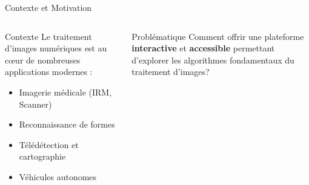\documentclass[aspectratio=169, 11pt]{beamer}
\begin{document}
\begin{frame}{Contexte et Motivation}
  \begin{columns}[T]
    \begin{block}{Contexte}
      Le traitement d'images numériques est au cœur de nombreuses applications modernes :
      \begin{itemize}
        \item Imagerie médicale (IRM, Scanner)
        \item Reconnaissance de formes
        \item Télédétection et cartographie
        \item Véhicules autonomes
      \end{itemize}
    \end{block}
    \vspace{6pt}
    \begin{alertblock}{Problématique}
      Comment offrir une plateforme \textbf{interactive} et \textbf{accessible} permettant d'explorer les algorithmes fondamentaux du traitement d'images?
    \end{alertblock}

  \end{columns}
\end{frame}
\end{document}
